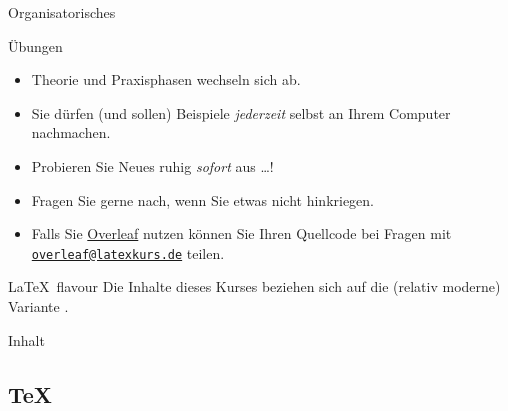 \documentclass[
	vorläufig=false,
	datum=2023-02-18,
	datum1=2023-02-18,
	datum2=2023-03-04,
	titel={erster Tag},
	web=true, handout,
	kursA,
]{../tex/latexkurs-slides}
\begin{document}
\begin{frame}[t]{Organisatorisches}
	\begin{block}{Übungen}
		\begin{itemize}
			\item Theorie und Praxisphasen wechseln sich ab.
			\item Sie dürfen (und sollen) Beispiele \emph{jederzeit} selbst an Ihrem Computer nachmachen.
			\item Probieren Sie Neues ruhig \emph{sofort} aus …!
			\item Fragen Sie gerne nach, wenn Sie etwas nicht hinkriegen.
			\item Falls Sie \href{https://www.overleaf.com?r=60500875&rm=d&rs=b}{Overleaf} nutzen können Sie Ihren Quellcode bei Fragen mit \href{mailto:overleaf@latexkurs.de}{\texttt{overleaf@latexkurs.de}} teilen.
		\end{itemize}
	\end{block}
		\begin{block}{\LaTeX\ flavour}
			Die Inhalte dieses Kurses beziehen sich auf die (relativ moderne) Variante .
		\end{block}
\end{frame}


\begin{frame}[t,allowframebreaks]{Inhalt}
	\tableofcontents
\end{frame}

\subsection*{\TeX}
\end{document}
